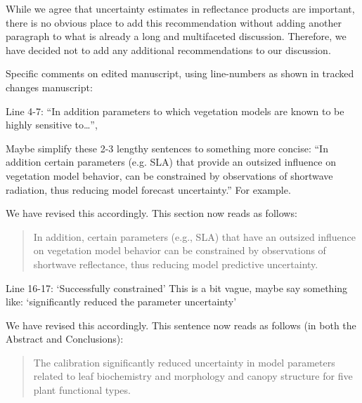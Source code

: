\documentclass{article}
\newenvironment{reviewer}{\par\color{Mahogany}\vspace{6pt}}{\par\vspace{6pt}}
\begin{document}
While we agree that uncertainty estimates in reflectance products are important, there is no obvious place to add this recommendation without adding another paragraph to what is already a long and multifaceted discussion.
Therefore, we have decided not to add any additional recommendations to our discussion.

\begin{reviewer}
  Specific comments on edited manuscript, using line-numbers as shown in tracked changes manuscript:

  Line 4-7: ``In addition parameters to which vegetation models are known to be highly sensitive to\ldots'',

  Maybe simplify these 2-3 lengthy sentences to something more concise: “In addition certain parameters (e.g. SLA) that provide an outsized influence on vegetation model behavior, can be constrained by observations of shortwave radiation, thus reducing model forecast uncertainty.” For example.
\end{reviewer}

We have revised this accordingly.
This section now reads as follows:

\begin{quote}
  In addition, certain parameters (e.g., SLA) that have an outsized influence on vegetation model behavior can be constrained by observations of shortwave reflectance, thus reducing model predictive uncertainty.
\end{quote}

\begin{reviewer}
  Line 16-17: ‘Successfully constrained’ This is a bit vague, maybe say something like: ‘significantly reduced the parameter uncertainty’
\end{reviewer}

We have revised this accordingly.
This sentence now reads as follows (in both the Abstract and Conclusions):

\begin{quote}
  The calibration significantly reduced uncertainty in model parameters related to leaf biochemistry and morphology and canopy structure for five plant functional types.
\end{quote}
\end{document}

